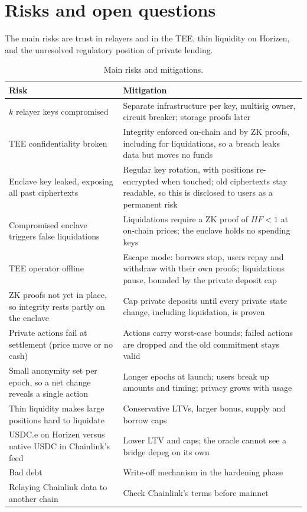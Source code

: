\documentclass[11pt,a4paper]{article}
\begin{document}
\section{Risks and open questions}

The main risks are trust in relayers and in the TEE, thin liquidity on Horizen, and the unresolved regulatory
position of private lending.

\begin{table}[h]
\centering
\caption{Main risks and mitigations.}
\label{tab:risks}
\begin{tabularx}{\textwidth}{@{}LL@{}}
\toprule
Risk & Mitigation \\
\midrule
$k$ relayer keys compromised & Separate infrastructure per key, multisig owner, circuit breaker; storage proofs
  later \\ \addlinespace
TEE confidentiality broken & Integrity enforced on-chain and by ZK proofs, including for liquidations, so a
  breach leaks data but moves no funds \\ \addlinespace
Enclave key leaked, exposing all past ciphertexts & Regular key rotation, with positions re-encrypted when
  touched; old ciphertexts stay readable, so this is disclosed to users as a permanent risk \\ \addlinespace
Compromised enclave triggers false liquidations & Liquidations require a ZK proof of $HF<1$ at on-chain prices;
  the enclave holds no spending keys \\ \addlinespace
TEE operator offline & Escape mode: borrows stop, users repay and withdraw with their own proofs; liquidations
  pause, bounded by the private deposit cap \\ \addlinespace
ZK proofs not yet in place, so integrity rests partly on the enclave & Cap private deposits until every private
  state change, including liquidation, is proven \\ \addlinespace
Private actions fail at settlement (price move or no cash) & Actions carry worst-case bounds; failed actions are
  dropped and the old commitment stays valid \\ \addlinespace
Small anonymity set per epoch, so a net change reveals a single action & Longer epochs at launch; users break up
  amounts and timing; privacy grows with usage \\ \addlinespace
Thin liquidity makes large positions hard to liquidate & Conservative LTVs, larger bonus, supply and borrow
  caps \\ \addlinespace
USDC.e on Horizen versus native USDC in Chainlink's feed & Lower LTV and caps; the oracle cannot see a bridge
  depeg on its own \\ \addlinespace
Bad debt & Write-off mechanism in the hardening phase \\ \addlinespace
Relaying Chainlink data to another chain & Check Chainlink's terms before mainnet \\
\bottomrule
\end{tabularx}
\end{table}
\end{document}
